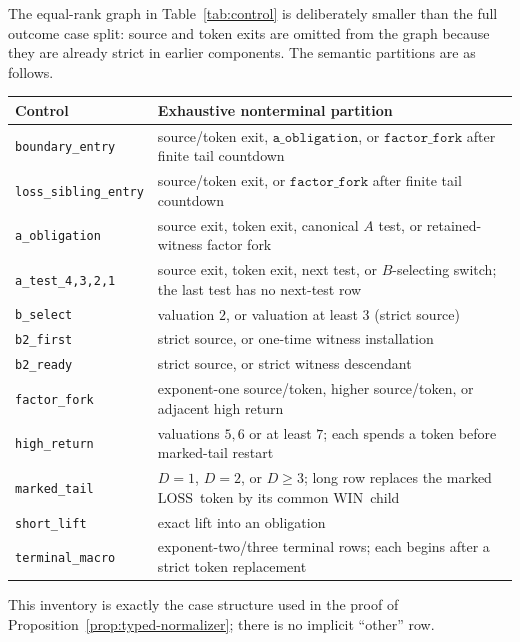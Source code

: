 \documentclass[11pt]{article}
\newcommand{\WIN}{\ensuremath{\mathrm{WIN}}}
\newcommand{\LOSS}{\ensuremath{\mathrm{LOSS}}}
\begin{document}
The equal-rank graph in Table~\ref{tab:control} is deliberately smaller than
the full outcome case split: source and token exits are omitted from the graph
because they are already strict in earlier components. The semantic partitions
are as follows.
\begin{center}
\small
\begin{tabular}{@{}p{.28\linewidth}p{.62\linewidth}@{}}
\toprule
Control & Exhaustive nonterminal partition \\
\midrule
\texttt{boundary\_entry} & source/token exit,
  $\texttt{a\_obligation}$, or $\texttt{factor\_fork}$ after finite tail countdown \\
\texttt{loss\_sibling\_entry} & source/token exit, or
  $\texttt{factor\_fork}$ after finite tail countdown \\
\texttt{a\_obligation} & source exit, token exit, canonical $A$ test, or
  retained-witness factor fork \\
\texttt{a\_test\_4,3,2,1} & source exit, token exit, next test, or
  $B$-selecting switch; the last test has no next-test row \\
\texttt{b\_select} & valuation $2$, or valuation at least $3$ (strict source) \\
\texttt{b2\_first} & strict source, or one-time witness installation \\
\texttt{b2\_ready} & strict source, or strict witness descendant \\
\texttt{factor\_fork} & exponent-one source/token, higher source/token, or
  adjacent high return \\
\texttt{high\_return} & valuations $5,6$ or at least $7$; each spends a token
  before marked-tail restart \\
\texttt{marked\_tail} & $D=1$, $D=2$, or $D\ge3$; long row replaces the
  marked \LOSS\ token by its common \WIN\ child \\
\texttt{short\_lift} & exact lift into an obligation \\
\texttt{terminal\_macro} & exponent-two/three terminal rows; each begins
  after a strict token replacement \\
\bottomrule
\end{tabular}
\end{center}
This inventory is exactly the case structure used in the proof of
Proposition~\ref{prop:typed-normalizer}; there is no implicit ``other'' row.
\end{document}
